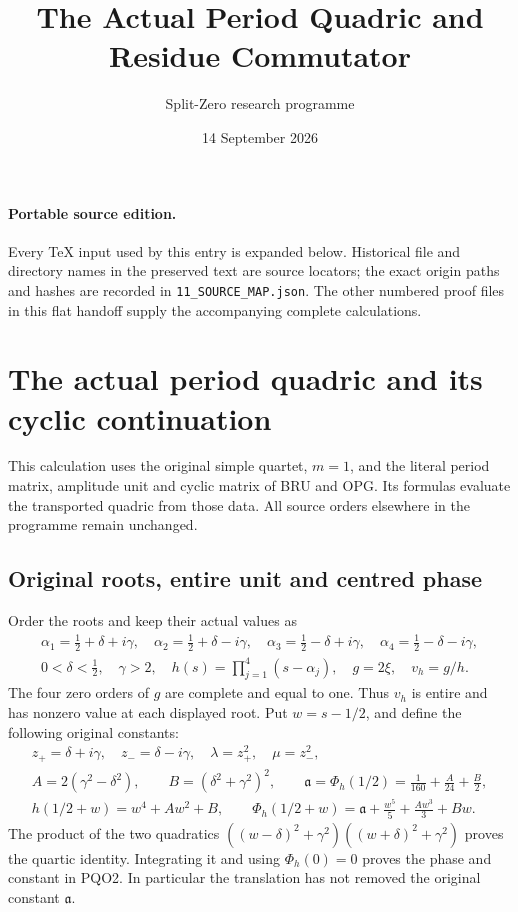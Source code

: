 \documentclass[11pt,a4paper]{article}
\title{The Actual Period Quadric and Residue Commutator}
\author{Split-Zero research programme}
\date{14 September 2026}
\begin{document}
\maketitle
\paragraph{Portable source edition.}
Every TeX input used by this entry is expanded below. Historical file
and directory names in the preserved text are source locators; the
exact origin paths and hashes are recorded in \texttt{11\_SOURCE\_MAP.json}.
The other numbered proof files in this flat handoff supply the
accompanying complete calculations.\par

\section{The actual period quadric and its cyclic continuation}
\label{sec:PQO}

This calculation uses the original simple quartet, $m=1$, and the
literal period matrix, amplitude unit and cyclic matrix of BRU and
OPG. Its formulas evaluate the transported quadric from those data.
All source orders elsewhere in the programme remain unchanged.

\subsection{Original roots, entire unit and centred phase}
Order the roots and keep their actual values as
\[
\begin{gathered}
 \alpha_1=\tfrac12+\delta+i\gamma,\quad
 \alpha_2=\tfrac12+\delta-i\gamma,\quad
 \alpha_3=\tfrac12-\delta+i\gamma,\quad
 \alpha_4=\tfrac12-\delta-i\gamma,\\
 0<\delta<\tfrac12,\quad\gamma>2,\quad
 h(s)=\prod_{j=1}^4(s-\alpha_j),\quad g=2\xi,\quad v_h=g/h.
\end{gathered}\tag{PQO1}
\]
The four zero orders of $g$ are complete and equal to one.
Thus $v_h$ is entire and has nonzero value at each displayed root.
Put $w=s-1/2$, and define the following original constants:
\[
\begin{gathered}
 z_+=\delta+i\gamma,\quad z_-=\delta-i\gamma,\quad
 \lambda=z_+^2,\quad\mu=z_-^2,\\
 A=2(\gamma^2-\delta^2),\qquad B=(\delta^2+\gamma^2)^2,\qquad
 \mathfrak a=\Phi_h(1/2)=\frac1{160}+\frac A{24}+\frac B2,\\
 h(1/2+w)=w^4+Aw^2+B,\qquad
 \Phi_h(1/2+w)=\mathfrak a+\frac{w^5}{5}+\frac{Aw^3}{3}+Bw.
\end{gathered}\tag{PQO2}
\]
The product of the two quadratics
$((w-\delta)^2+\gamma^2)((w+\delta)^2+\gamma^2)$ proves the
quartic identity. Integrating it and using $\Phi_h(0)=0$
proves the phase and constant in PQO2. In particular the translation
has not removed the original constant $\mathfrak a$.
\end{document}
